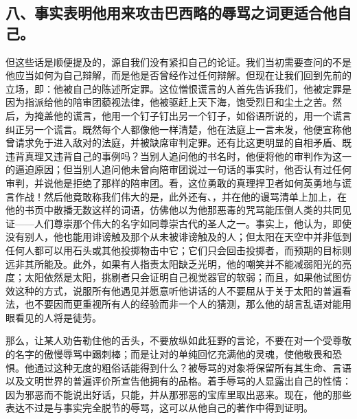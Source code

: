 
\subsection{八、事实表明他用来攻击巴西略的辱骂之词更适合他自己。}

但这些话是顺便提及的，源自我们没有紧扣自己的论证。我们当初需要查问的不是他应当如何为自己辩解，而是他是否曾经作过任何辩解。但现在让我们回到先前的立场，即：他被自己的陈述所定罪。这位憎恨谎言的人首先告诉我们，他被定罪是因为指派给他的陪审团藐视法律，他被驱赶上天下海，饱受烈日和尘土之苦。然后，为掩盖他的谎言，他用一个钉子钉出另一个钉子，如俗语所说的，用一个谎言纠正另一个谎言。既然每个人都像他一样清楚，他在法庭上一言未发，他便宣称他曾请求免于进入敌对的法庭，并被缺席审判定罪。还有比这更明显的自相矛盾、既违背真理又违背自己的事例吗？当别人追问他的书名时，他便将他的审判作为这一的逼迫原因；但当别人追问他未曾向陪审团说过一句话的事实时，他否认有过任何审判，并说他是拒绝了那样的陪审团。看，这位勇敢的真理捍卫者如何英勇地与谎言作战！然后他竟敢称我们伟大的是，此外还有、，并在他的谩骂清单上加上，在他的书页中散播无数这样的词语，仿佛他以为他那恶毒的咒骂能压倒人类的共同见证——人们尊崇那个伟大的名字如同尊崇古代的圣人之一。事实上，他认为，即使没有别人，他也能用诽谤触及那个从未被诽谤触及的人；但太阳在天空中并非低到任何人都可以用石头或其他投掷物击中它；它们只会回击投掷者，而预期的目标则远非其所能及。此外，如果有人指责太阳缺乏光明，他的嘲笑并不能减弱阳光的亮度；太阳依然是太阳，挑剔者只会证明自己视觉器官的软弱；而且，如果他试图仿效这种的方式，说服所有他遇见并愿意听他讲话的人不要屈从于关于太阳的普遍看法，也不要因而更重视所有人的经验而非一个人的猜测，那么他的胡言乱语对能用眼看见的人将是徒劳。\par

那么，让某人劝告勒住他的舌头，不要放纵如此狂野的言论，不要在对一个受尊敬的名字的傲慢辱骂中踢刺棒；而是让对的单纯回忆充满他的灵魂，使他敬畏和恐惧。他通过这种无度的粗俗话能得到什么？被辱骂的对象将保留所有其生命、言语以及文明世界的普遍评价所宣告他拥有的品格。着手辱骂的人显露出自己的性情：因为邪恶而不能说出好话，只能，并从那邪恶的宝库里取出恶来。现在，他的那些表达不过是与事实完全脱节的辱骂，这可以从他自己的著作中得到证明。\par


